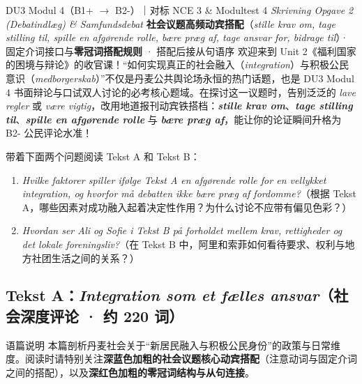 {DU3 Modul 4（B1+ $\rightarrow$ B2-）｜对标 NCE 3 \& Modultest 4 \textit{Skrivning Opgave 2 (Debatindlæg) \& Samfundsdebat}}
{\textbf{社会议题高频动宾搭配}（\textit{stille krav om, tage stilling til, spille en afgørende rolle, bære præg af, tage ansvar for, bidrage til}）· 固定介词接口与\textbf{零冠词搭配规则} · 搭配后接从句语序}
{欢迎来到 Unit 2《福利国家的困境与辩论》的收官课！“如何实现真正的社会融入（\textit{integration}）与积极公民意识（\textit{medborgerskab}）”不仅是丹麦公共舆论场永恒的热门话题，也是 DU3 Modul 4 书面辩论与口试双人讨论的必考核心题域。在探讨这一议题时，告别泛泛的 \textit{lave regler} 或 \textit{være vigtig}，改用地道报刊动宾铁搭档：\textbf{\textit{stille krav om}}、\textbf{\textit{tage stilling til}}、\textbf{\textit{spille en afgørende rolle}} 与 \textbf{\textit{bære præg af}}，能让你的论证瞬间升格为 B2- 公民评论水准！}

\begin{foerduleaeser}
带着下面两个问题阅读 Tekst A 和 Tekst B：
\begin{enumerate}
  \item \textit{Hvilke faktorer spiller ifølge Tekst A en afgørende rolle for en vellykket integration, og hvorfor må debatten ikke bære præg af fordomme?}（根据 Tekst A，哪些因素对成功融入起着决定性作用？为什么讨论不应带有偏见色彩？）
  \item \textit{Hvordan ser Ali og Sofie i Tekst B på forholdet mellem krav, rettigheder og det lokale foreningsliv?}（在 Tekst B 中，阿里和索菲如何看待要求、权利与地方社团生活之间的关系？）
\end{enumerate}
\end{foerduleaeser}


\subsection*{Tekst A：\textit{Integration som et fælles ansvar}（社会深度评论 · 约 220 词）}

\begin{tipbox}{语篇说明}
本篇剖析丹麦社会关于“新居民融入与积极公民身份”的政策与日常维度。阅读时请特别关注\textbf{\color{NCDNavy}深蓝色加粗的社会议题核心动宾搭配}（注意动词与固定介词之间的搭配），以及\textbf{\color{NCDRed}深红色加粗的零冠词结构与从句连接}。
\end{tipbox}


